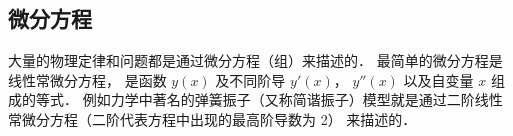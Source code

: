 \subsection{微分方程}
大量的物理定律和问题都是通过微分方程（组）来描述的． 最简单的微分方程是线性常微分方程，%
是函数 $y(x)$ 及不同阶导 $y'(x)$， $y''(x)$ 以及自变量 $x$ 组成的等式． 例如力学中著名的弹簧振子（又称简谐振子）模型就是通过二阶线性常微分方程（二阶代表方程中出现的最高阶导数为 2） 来描述的．



